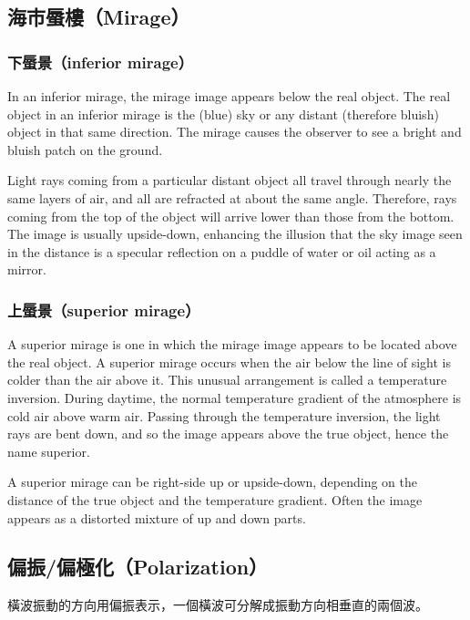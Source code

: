 \documentclass[a4paper,12pt]{report}
\begin{document}
\subsection{海市蜃樓（Mirage）}
\subsubsection{下蜃景（inferior mirage）}
In an inferior mirage, the mirage image appears below the real object. The real object in an inferior mirage is the (blue) sky or any distant (therefore bluish) object in that same direction. The mirage causes the observer to see a bright and bluish patch on the ground.

Light rays coming from a particular distant object all travel through nearly the same layers of air, and all are refracted at about the same angle. Therefore, rays coming from the top of the object will arrive lower than those from the bottom. The image is usually upside-down, enhancing the illusion that the sky image seen in the distance is a specular reflection on a puddle of water or oil acting as a mirror.
\subsubsection{上蜃景（superior mirage）}
A superior mirage is one in which the mirage image appears to be located above the real object. A superior mirage occurs when the air below the line of sight is colder than the air above it. This unusual arrangement is called a temperature inversion. During daytime, the normal temperature gradient of the atmosphere is cold air above warm air. Passing through the temperature inversion, the light rays are bent down, and so the image appears above the true object, hence the name superior.

A superior mirage can be right-side up or upside-down, depending on the distance of the true object and the temperature gradient. Often the image appears as a distorted mixture of up and down parts.
\subsection{偏振/偏極化（Polarization）}
橫波振動的方向用偏振表示，一個橫波可分解成振動方向相垂直的兩個波。
\end{document}
